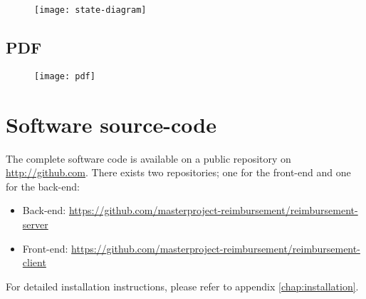 \begin{figure}[H]
    {\texttt{[image: state-diagram]}}
\end{figure}

\section{PDF}
\label{sec:app-pdf}

\begin{figure}[H]
    {\texttt{[image: pdf]}}
\end{figure}

\chapter{Software source-code}

The complete software code is available on a public repository on \url{http://github.com}. There exists two repositories; one for the front-end and one for the back-end:

\begin{itemize}
\item Back-end: \newline \url{https://github.com/masterproject-reimbursement/reimbursement-server}
\item Front-end: \newline \url{https://github.com/masterproject-reimbursement/reimbursement-client}
\end{itemize}

For detailed installation instructions, please refer to appendix \ref{chap:installation}. 
